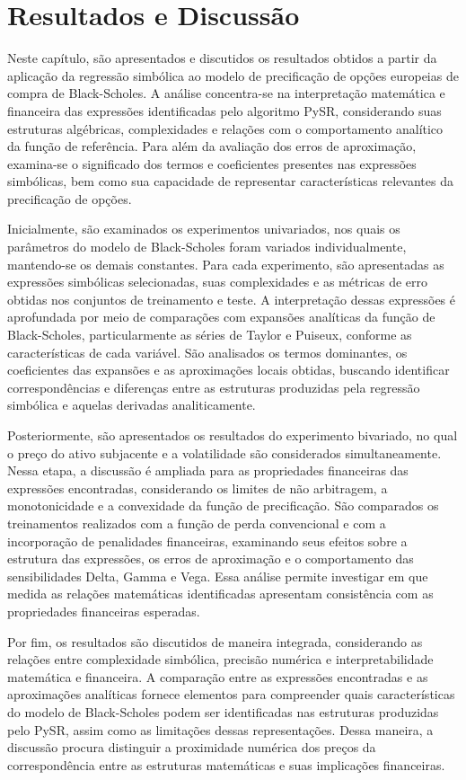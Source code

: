 
\section{Resultados e Discussão}
Neste capítulo, são apresentados e discutidos os resultados obtidos a partir da aplicação da regressão simbólica ao modelo de precificação de opções europeias de compra de Black-Scholes. A análise concentra-se na interpretação matemática e financeira das expressões identificadas pelo algoritmo PySR, considerando suas estruturas algébricas, complexidades e relações com o comportamento analítico da função de referência. Para além da avaliação dos erros de aproximação, examina-se o significado dos termos e coeficientes presentes nas expressões simbólicas, bem como sua capacidade de representar características relevantes da precificação de opções.

Inicialmente, são examinados os experimentos univariados, nos quais os parâmetros do modelo de Black-Scholes foram variados individualmente, mantendo-se os demais constantes. Para cada experimento, são apresentadas as expressões simbólicas selecionadas, suas complexidades e as métricas de erro obtidas nos conjuntos de treinamento e teste. A interpretação dessas expressões é aprofundada por meio de comparações com expansões analíticas da função de Black-Scholes, particularmente as séries de Taylor e Puiseux, conforme as características de cada variável. São analisados os termos dominantes, os coeficientes das expansões e as aproximações locais obtidas, buscando identificar correspondências e diferenças entre as estruturas produzidas pela regressão simbólica e aquelas derivadas analiticamente.

Posteriormente, são apresentados os resultados do experimento bivariado, no qual o preço do ativo subjacente e a volatilidade são considerados simultaneamente. Nessa etapa, a discussão é ampliada para as propriedades financeiras das expressões encontradas, considerando os limites de não arbitragem, a monotonicidade e a convexidade da função de precificação. São comparados os treinamentos realizados com a função de perda convencional e com a incorporação de penalidades financeiras, examinando seus efeitos sobre a estrutura das expressões, os erros de aproximação e o comportamento das sensibilidades Delta, Gamma e Vega. Essa análise permite investigar em que medida as relações matemáticas identificadas apresentam consistência com as propriedades financeiras esperadas.

Por fim, os resultados são discutidos de maneira integrada, considerando as relações entre complexidade simbólica, precisão numérica e interpretabilidade matemática e financeira. A comparação entre as expressões encontradas e as aproximações analíticas fornece elementos para compreender quais características do modelo de Black-Scholes podem ser identificadas nas estruturas produzidas pelo PySR, assim como as limitações dessas representações. Dessa maneira, a discussão procura distinguir a proximidade numérica dos preços da correspondência entre as estruturas matemáticas e suas implicações financeiras.

